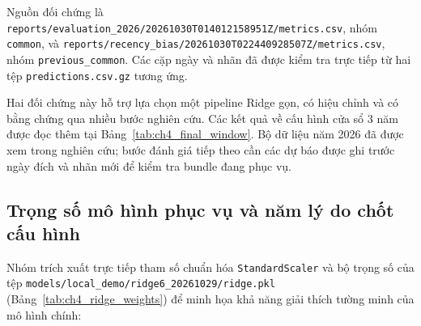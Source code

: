 \documentclass[12pt,a4paper]{report}
\begin{document}
{\footnotesize Nguồn đối chứng là \nolinkurl{reports/evaluation_2026/20261030T014012158951Z/metrics.csv}, nhóm \texttt{common}, và \nolinkurl{reports/recency_bias/20261030T022440928507Z/metrics.csv}, nhóm \texttt{previous\_common}. Các cặp ngày và nhãn đã được kiểm tra trực tiếp từ hai tệp \nolinkurl{predictions.csv.gz} tương ứng.}

Hai đối chứng này hỗ trợ lựa chọn một pipeline Ridge gọn, có hiệu chỉnh và có bằng chứng qua nhiều bước nghiên cứu. Các kết quả về cấu hình cửa sổ 3 năm được đọc thêm tại Bảng~\ref{tab:ch4_final_window}. Bộ dữ liệu năm 2026 đã được xem trong nghiên cứu; bước đánh giá tiếp theo cần các dự báo được ghi trước ngày đích và nhãn mới để kiểm tra bundle đang phục vụ.

\FloatBarrier
\subsection{Trọng số mô hình phục vụ và năm lý do chốt cấu hình}
Nhóm trích xuất trực tiếp tham số chuẩn hóa \texttt{StandardScaler} và bộ trọng số của tệp \nolinkurl{models/local_demo/ridge6_20261029/ridge.pkl} (Bảng~\ref{tab:ch4_ridge_weights}) để minh họa khả năng giải thích tường minh của mô hình chính:
\end{document}
